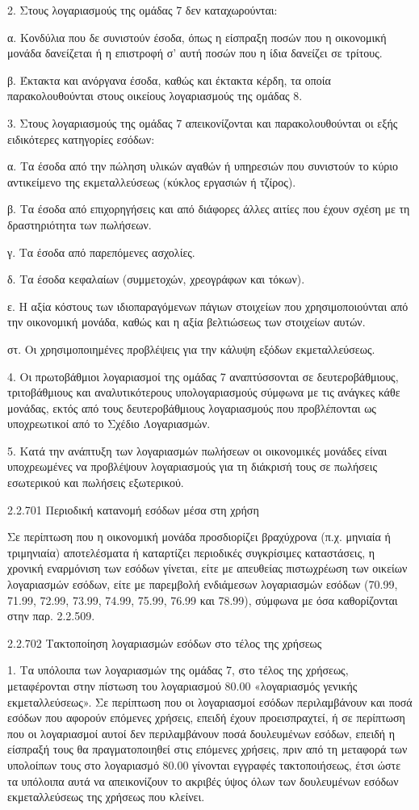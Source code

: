 \documentclass[A4,10pt,greek]{book}
\begin{document}
2. Στους λογαριασμούς της ομάδας 7 δεν καταχωρούνται:

α. Κονδύλια που δε συνιστούν έσοδα, όπως η είσπραξη ποσών που η οικονομική μονάδα δανείζεται ή η επιστροφή σ' αυτή ποσών που η ίδια δανείζει σε τρίτους.

β. Έκτακτα και ανόργανα έσοδα, καθώς και έκτακτα κέρδη, τα οποία παρακολουθούνται στους οικείους λογαριασμούς της ομάδας 8.

3. Στους λογαριασμούς της ομάδας 7 απεικονίζονται και παρακολουθούνται οι εξής ειδικότερες κατηγορίες εσόδων:

α. Τα έσοδα από την πώληση υλικών αγαθών ή υπηρεσιών που συνιστούν το κύριο αντικείμενο της εκμεταλλεύσεως (κύκλος εργασιών ή τζίρος).

β. Τα έσοδα από επιχορηγήσεις και από διάφορες άλλες αιτίες που έχουν σχέση με τη δραστηριότητα των πωλήσεων.

γ. Τα έσοδα από παρεπόμενες ασχολίες.

δ. Τα έσοδα κεφαλαίων (συμμετοχών, χρεογράφων και τόκων).

ε. Η αξία κόστους των ιδιοπαραγόμενων πάγιων στοιχείων που χρησιμοποιούνται από την οικονομική μονάδα, καθώς και η αξία βελτιώσεως των στοιχείων αυτών.

στ. Οι χρησιμοποιημένες προβλέψεις για την κάλυψη εξόδων εκμεταλλεύσεως.

4. Οι πρωτοβάθμιοι λογαριασμοί της ομάδας 7 αναπτύσσονται σε δευτεροβάθμιους, τριτοβάθμιους και αναλυτικότερους υπολογαριασμούς σύμφωνα με τις ανάγκες κάθε μονάδας, εκτός από τους δευτεροβάθμιους λογαριασμούς που προβλέπονται ως υποχρεωτικοί από το Σχέδιο Λογαριασμών.

5. Κατά την ανάπτυξη των λογαριασμών πωλήσεων οι οικονομικές μονάδες είναι υποχρεωμένες να προβλέψουν λογαριασμούς για τη διάκρισή τους σε πωλήσεις εσωτερικού και πωλήσεις εξωτερικού.

2.2.701 Περιοδική κατανομή εσόδων μέσα στη χρήση

Σε περίπτωση που η οικονομική μονάδα προσδιορίζει βραχύχρονα (π.χ. μηνιαία ή τριμηνιαία) αποτελέσματα ή καταρτίζει περιοδικές συγκρίσιμες καταστάσεις, η χρονική εναρμόνιση των εσόδων γίνεται, είτε με απευθείας πιστωχρέωση των οικείων λογαριασμών εσόδων, είτε με παρεμβολή ενδιάμεσων λογαριασμών εσόδων (70.99, 71.99, 72.99, 73.99, 74.99, 75.99, 76.99 και 78.99), σύμφωνα με όσα καθορίζονται στην παρ. 2.2.509.

2.2.702 Τακτοποίηση λογαριασμών εσόδων στο τέλος της χρήσεως

1. Τα υπόλοιπα των λογαριασμών της ομάδας 7, στο τέλος της χρήσεως, μεταφέρονται στην πίστωση του λογαριασμού 80.00 «λογαριασμός γενικής εκμεταλλεύσεως». Σε περίπτωση που οι λογαριασμοί εσόδων περιλαμβάνουν και ποσά εσόδων που αφορούν επόμενες χρήσεις, επειδή έχουν προεισπραχτεί, ή σε περίπτωση που οι λογαριασμοί αυτοί δεν περιλαμβάνουν ποσά δουλευμένων εσόδων, επειδή η είσπραξή τους θα πραγματοποιηθεί στις επόμενες χρήσεις, πριν από τη μεταφορά των υπολοίπων τους στο λογαριασμό 80.00 γίνονται εγγραφές τακτοποιήσεως, έτσι ώστε τα υπόλοιπα αυτά να απεικονίζουν το ακριβές ύψος όλων των δουλευμένων εσόδων εκμεταλλεύσεως της χρήσεως που κλείνει.
\end{document}
